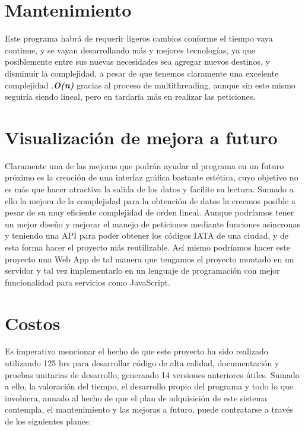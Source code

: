 \documentclass{article}
\begin{document}
\section{Mantenimiento}
Este programa habrá de requerir ligeros cambios conforme el tiempo vaya continue, y se vayan desarrollando más y mejores tecnologías, ya que posiblemente entre sus nuevas necesidades sea agregar nuevos destinos, y disminuir la complejidad, a pesar de que tenemos claramente una excelente complejidad .\textbf{\textit{O(n)}} gracias al proceso de multithreading, aunque sin este mismo seguiría siendo lineal, pero en tardaría más en realizar las peticiones.
\section{Visualización de mejora a futuro}
Claramente una de las mejoras que podrán ayudar al programa en un futuro próximo es la creación de una interfaz gráfica bastante estética, cuyo objetivo no es más que hacer atractiva la salida de los datos y facilite su lectura. Sumado a ello la mejora de la complejidad para la obtención de datos la creemos posible a pesar de su muy eficiente complejidad de orden lineal. Aunque podríamos tener un mejor diseño y mejorar el manejo de peticiones mediante funciones asincronas y teniendo una API para poder obtener los códigos IATA de una ciudad, y de esta forma hacer el proyecto más reutilizable. Así mismo podríamos hacer este proyecto una Web App de tal manera que tengamos el proyecto montado en un servidor y tal vez implementarlo en un lenguaje de programación con mejor funcionalidad para servicios como JavaScript.

\section{Costos}
Es imperativo mencionar el hecho de que este proyecto ha sido realizado utilizando 125 hrs para desarrollar código de alta calidad, documentación y pruebas unitarias de desarrollo, generando 14 versiones anteriores útiles. Sumado a ello, la valoración del tiempo, el desarrollo propio del programa y todo lo que involucra, aunado al hecho de que el plan de adquisición de este sistema contempla, el mantenimiento y las mejoras a futuro, puede contratarse a través de los siguientes planes:\\
\end{document}
